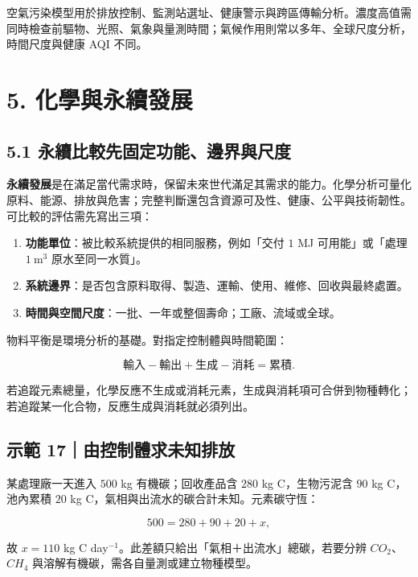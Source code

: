 \documentclass[11pt,a4paper]{article}
\providecommand{\tightlist}{%
  \setlength{\itemsep}{0pt}\setlength{\parskip}{0pt}}
\begin{document}
空氣污染模型用於排放控制、監測站選址、健康警示與跨區傳輸分析。濃度高值需同時檢查前驅物、光照、氣象與量測時間；氣候作用則常以多年、全球尺度分析，時間尺度與健康 AQI 不同。

\section{5. 化學與永續發展}\label{ux5316ux5b78ux8207ux6c38ux7e8cux767cux5c55}

\subsection{5.1 永續比較先固定功能、邊界與尺度}\label{ux6c38ux7e8cux6bd4ux8f03ux5148ux56faux5b9aux529fux80fdux908aux754cux8207ux5c3aux5ea6}

\textbf{永續發展}是在滿足當代需求時，保留未來世代滿足其需求的能力。化學分析可量化原料、能源、排放與危害；完整判斷還包含資源可及性、健康、公平與技術韌性。可比較的評估需先寫出三項：

\begin{enumerate}
\def\labelenumi{\arabic{enumi}.}
\tightlist
\item
  \textbf{功能單位}：被比較系統提供的相同服務，例如「交付 \(1\) MJ 可用能」或「處理 \(1\ \mathrm{m^3}\) 原水至同一水質」。
\item
  \textbf{系統邊界}：是否包含原料取得、製造、運輸、使用、維修、回收與最終處置。
\item
  \textbf{時間與空間尺度}：一批、一年或整個壽命；工廠、流域或全球。
\end{enumerate}

物料平衡是環境分析的基礎。對指定控制體與時間範圍：

\[
\text{輸入}-\text{輸出}+\text{生成}-\text{消耗}=\text{累積}.
\]

若追蹤元素總量，化學反應不生成或消耗元素，生成與消耗項可合併到物種轉化；若追蹤某一化合物，反應生成與消耗就必須列出。

\begin{HandoutWorkedExample}

\subsection{示範 17｜由控制體求未知排放}\label{ux793aux7bc4-17ux7531ux63a7ux5236ux9ad4ux6c42ux672aux77e5ux6392ux653e}

某處理廠一天進入 \(500\) kg 有機碳；回收產品含 \(280\) kg C，生物污泥含 \(90\) kg C，池內累積 \(20\) kg C，氣相與出流水的碳合計未知。元素碳守恆：

\[
500=280+90+20+x,
\]

故 \(x=110\) kg C day\(^{-1}\)。此差額只給出「氣相＋出流水」總碳，若要分辨 \(CO_2\)、\(CH_4\) 與溶解有機碳，需各自量測或建立物種模型。

\end{HandoutWorkedExample}
\end{document}
